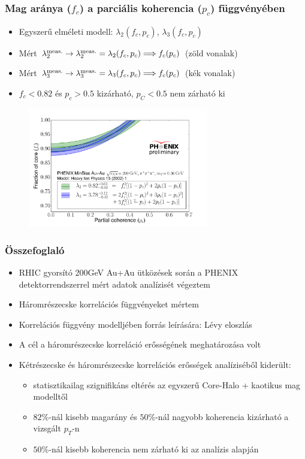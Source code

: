 \documentclass{beamer}
\begin{document}
\begin{frame}
\frametitle{Mag aránya ($f_c$) a parciális koherencia ($p_c$) függvényében}
\begin{itemize}
\vspace{-0.004\textheight}
\item Egyszerű elméleti modell: $\lambda_2(f_c, p_c)$, $\lambda_3(f_c, p_c)$ 
\item Mért $\lambda_2^{\rm meas.} \rightarrow \lambda_2^{\rm meas.}=\lambda_2(f_c,p_c) \Longrightarrow f_c(p_c)$ (zöld vonalak)
\item Mért $\lambda_3^{\rm meas.} \rightarrow \lambda_3^{\rm meas.}=\lambda_3(f_c,p_c) \Longrightarrow f_c(p_c)$ (kék vonalak)
\item $f_c<0.82$ és $p_c>0.5$ kizárható, $p_C<0.5$ nem zárható ki
\end{itemize}

\begin{figure}
\includegraphics[width=0.7\textwidth]{pic/cropped_fcpc2}
\end{figure}
\end{frame}

\begin{frame}
\frametitle{Összefoglaló}
\begin{itemize}
\setlength{\itemsep}{10pt}
\item RHIC gyorsító 200GeV Au+Au ütközések során a PHENIX detektorrendszerrel mért adatok analízisét végeztem
\item Háromrészecske korrelációs függvényeket mértem
\item Korrelációs függvény modelljében forrás leírására: Lévy eloszlás
\item A cél a háromrészecske korreláció erősségének meghatározása volt
\item Kétrészecske és háromrészecske korrelációs erősségek analíziséből kiderült:
\begin{itemize}
	\item statisztikailag szignifikáns eltérés az egyszerű Core-Halo + kaotikus mag modelltől
	\item $82\%$-nál kisebb magarány és $50\%$-nál nagyobb koherencia kizárható a vizsgált $p_T$-n
	\item $50\%$-nál kisebb koherencia nem zárható ki az analízis alapján
\end{itemize}
\end{itemize}
\end{frame}
\end{document}
